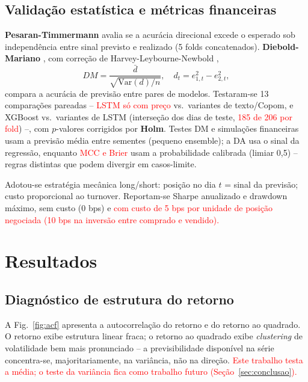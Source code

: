 \documentclass[conference]{IEEEtran}
\newcommand{\novo}[1]{\textcolor{red}{#1}}
\begin{document}
\subsection{Valida\c{c}\~ao estat\'istica e m\'etricas financeiras}
\textbf{Pesaran-Timmermann} \cite{pesaran1992} avalia se a acur\'acia direcional excede o esperado sob independ\^encia entre sinal previsto e realizado (5 folds concatenados). \textbf{Diebold-Mariano} \cite{diebold1995}, com corre\c{c}\~ao de Harvey-Leybourne-Newbold \cite{harvey1997},
\begin{equation}
DM = \frac{\bar{d}}{\sqrt{\mathrm{Var}(d)/n}}, \quad d_t = e_{1,t}^2 - e_{2,t}^2,
\label{eq:dm}
\end{equation}
compara a acur\'acia de previs\~ao entre pares de modelos. Testaram-se 13 compara\c{c}\~oes pareadas -- \novo{LSTM s\'o com pre\c{c}o} vs.\ variantes de texto/Copom, e XGBoost vs.\ variantes de LSTM (interse\c{c}\~ao dos dias de teste, \novo{185 de 206 por fold}) --, com $p$-valores corrigidos por \textbf{Holm}. Testes DM e simula\c{c}\~oes financeiras usam a previs\~ao m\'edia entre sementes (pequeno ensemble); a DA usa o sinal da regress\~ao, enquanto \novo{MCC e Brier} usam a probabilidade calibrada (limiar 0,5) -- regras distintas que podem divergir em casos-limite.

Adotou-se estrat\'egia mec\^anica long/short: posi\c{c}\~ao no dia $t$ = sinal da previs\~ao; custo proporcional ao turnover. Reportam-se Sharpe anualizado e drawdown m\'aximo, sem custo (0 bps) e \novo{com custo de 5 bps por unidade de posi\c{c}\~ao negociada (10 bps na invers\~ao entre comprado e vendido).}

\section{Resultados}

\subsection{Diagn\'ostico de estrutura do retorno}
A Fig.~\ref{fig:acf} apresenta a autocorrela\c{c}\~ao do retorno e do retorno ao quadrado. O retorno exibe estrutura linear fraca; o retorno ao quadrado exibe \emph{clustering} de volatilidade bem mais pronunciado -- a previsibilidade dispon\'ivel na s\'erie concentra-se, majoritariamente, na vari\^ancia, n\~ao na dire\c{c}\~ao. \novo{Este trabalho testa a m\'edia; o teste da vari\^ancia fica como trabalho futuro (Se\c{c}\~ao~\ref{sec:conclusao}).}
\end{document}
